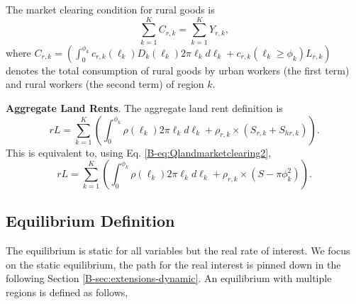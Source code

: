 \documentclass[11pt]{report}
\begin{document}
The market clearing condition for rural goods is
\begin{equation}
\sum_{k=1}^K C_{r,k}=\sum_{k=1}^K  Y_{r,k}\label{B-eq:rgoods-market-clearing-k},
\end{equation}
where $C_{r,k}=\left( \int_0^{\phi_k} c_{r,k}(\ell_k)D_k(\ell_k) 2\pi \ell_k d\ell_k+ c_{r,k}(\ell_k \geq \phi_k)L_{r,k}\right)$ denotes the total consumption of rural goods by urban workers (the first term) and rural workers (the second term) of region $k$. 


\noindent \textbf{Aggregate Land Rents}. The aggregate land rent definition is
\begin{equation}
rL=\sum_{k=1}^K\left(\int_{0}^{\phi_k} \rho(\ell_k)2\pi\ell_k d\ell_k+\rho_{r,k} \times (S_{r,k} + S_{hr,k})\right).
\label{B-eq:QrL2}
\end{equation}
This is equivalent to, using Eq. \ref{B-eq:Qlandmarketclearing2},
\begin{equation*}
rL=\sum_{k=1}^K\left(\int_{0}^{\phi_k} \rho(\ell_k)2\pi\ell_k d\ell_k+\rho_{r,k} \times (S-\pi\phi_k^2)\right).
\end{equation*} 

\subsection{Equilibrium Definition}\label{B-sec:equilibrium}

The equilibrium is static for all variables but the real rate of interest. We focus on the static equilibrium, the path for the real interest is pinned down in the following Section \ref{B-sec:extensions-dynamic}. An equilibrium with multiple regions is defined as follows,
\end{document}
